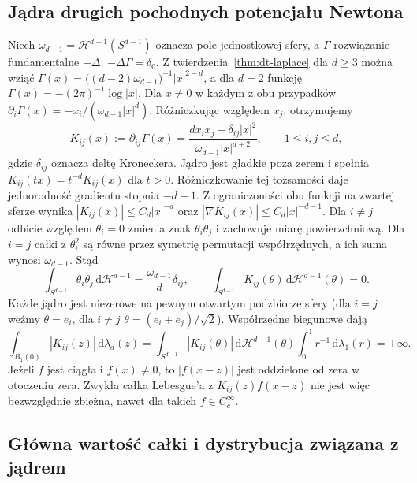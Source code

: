 \subsection{Jądra drugich pochodnych potencjału Newtona}
Niech $\omega_{d-1}=\mathcal H^{d-1}(S^{d-1})$ oznacza pole
jednostkowej sfery, a $\Gamma$ rozwiązanie fundamentalne $-\Delta$:
$-\Delta\Gamma=\delta_0$. Z twierdzenia~\ref{thm:dt-laplace} dla $d\ge3$ można wziąć
$\Gamma(x)=\bigl((d-2)\omega_{d-1}\bigr)^{-1}|x|^{2-d}$,
a dla $d=2$ funkcję $\Gamma(x)=-(2\pi)^{-1}\log|x|$.
Dla $x\ne0$ w każdym z obu przypadków
$\partial_i\Gamma(x)=-x_i/(\omega_{d-1}|x|^d)$.
Różniczkując względem $x_j$, otrzymujemy
\begin{equation}\label{eq:dt-cz-kernel}
 K_{ij}(x):=\partial_{ij}\Gamma(x)
 =\frac{d x_ix_j-\delta_{ij}|x|^2}
 {\omega_{d-1}|x|^{d+2}},\qquad 1\le i,j\le d,
\end{equation}
gdzie $\delta_{ij}$ oznacza deltę Kroneckera.
Jądro jest gładkie poza zerem i spełnia
$K_{ij}(tx)=t^{-d}K_{ij}(x)$ dla $t>0$.
Różniczkowanie tej tożsamości daje jednorodność gradientu
stopnia $-d-1$. Z ograniczoności obu funkcji na zwartej
sferze wynika $|K_{ij}(x)|\le C_d|x|^{-d}$ oraz
$|\nabla K_{ij}(x)|\le C_d|x|^{-d-1}$.
Dla $i\ne j$ odbicie względem $\theta_i=0$ zmienia znak
$\theta_i\theta_j$ i zachowuje miarę powierzchniową.
Dla $i=j$ całki z $\theta_i^2$ są równe przez symetrię
permutacji współrzędnych, a ich suma wynosi $\omega_{d-1}$.
Stąd
\[
 \int_{S^{d-1}}\theta_i\theta_j\,\mathrm d\mathcal H^{d-1}
 =\frac{\omega_{d-1}}d\delta_{ij},\qquad
 \int_{S^{d-1}}K_{ij}(\theta)\,\mathrm d\mathcal H^{d-1}(\theta)=0.
\]
Każde jądro jest niezerowe na pewnym otwartym podzbiorze
sfery (dla $i=j$ weźmy $\theta=e_i$, dla $i\ne j$
$\theta=(e_i+e_j)/\sqrt2$). Współrzędne biegunowe dają
\[
 \int_{B_1(0)}|K_{ij}(z)|\,\mathrm d\lambda_d(z)
 =\int_{S^{d-1}}|K_{ij}(\theta)|\,\mathrm d\mathcal H^{d-1}(\theta)
 \int_0^1 r^{-1}\,\mathrm d\lambda_1(r)=+\infty .
\]
Jeżeli $f$ jest ciągła i $f(x)\ne0$, to $|f(x-z)|$
jest oddzielone od zera w otoczeniu zera. Zwykła całka
Lebesgue'a z $K_{ij}(z)f(x-z)$ nie jest więc bezwzględnie
zbieżna, nawet dla takich $f\in C_c^\infty$.

\subsection{Główna wartość całki i dystrybucja związana z jądrem}

